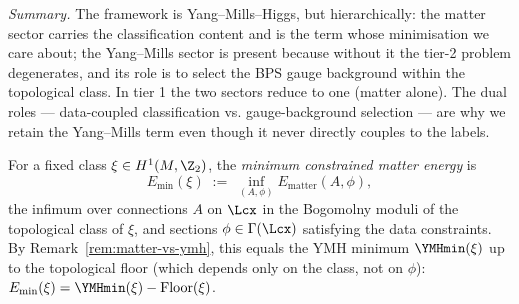 \begin{remark}
\emph{Summary.} The framework is Yang--Mills--Higgs, but
hierarchically: the matter sector carries the classification content
and is the term whose minimisation we care about; the Yang--Mills
sector is present because without it the tier-2 problem degenerates,
and its role is to select the BPS gauge background within the
topological class. In tier 1 the two sectors reduce to one (matter
alone). The dual roles --- data-coupled classification vs.
gauge-background selection --- are why we retain the Yang--Mills
term even though it never directly couples to the labels.
\end{remark}

\begin{definition}\label{def:ymh-min}
For a fixed class $\xi\in H^1(M,\Z_2)$, the \emph{minimum constrained
matter energy} is
\[
   E_{\min}(\xi) \;:=\;
   \inf_{(A,\phi)} E_{\mathrm{matter}}(A,\phi),
\]
the infimum over connections $A$ on $\Lcx$ in the Bogomolny moduli
of the topological class of $\xi$, and sections
$\phi\in\Gamma(\Lcx)$ satisfying the data constraints. By
Remark~\ref{rem:matter-vs-ymh}, this equals the YMH minimum
$\YMHmin(\xi)$ up to the topological floor (which depends only on
the class, not on $\phi$):
$E_{\min}(\xi) = \YMHmin(\xi) - \mathrm{Floor}(\xi)$.
\end{definition}

